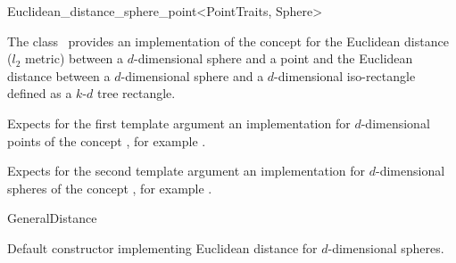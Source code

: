 

\begin{ccRefClass}{Euclidean_distance_sphere_point<PointTraits, Sphere>}  %


\ccDefinition
  
The class \ccRefName\ provides an implementation of 
the  concept
for the Euclidean distance ($l_2$ metric) between a $d$-dimensional sphere and a point and 
the Euclidean distance between a $d$-dimensional sphere
and a $d$-dimensional iso-rectangle defined as a $k$-$d$ tree rectangle.



\ccParameters
Expects for the first template argument
an implementation for
$d$-dimensional points of
the concept , 
for example .

Expects for the second template argument an implementation 
for $d$-dimensional spheres of the concept ,
for example .


\ccIsModel

GeneralDistance

\ccTypes



\ccCreation
{}  %


{Default constructor implementing Euclidean distance for
$d$-dimensional spheres.}

\ccOperations



\end{ccRefClass}
